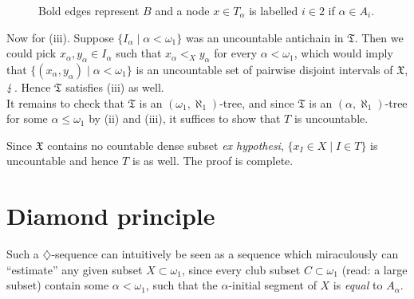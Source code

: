 {\begin{figure}[h]
\label{01graph Figure}
\caption{Bold edges represent $B$ and a node $x\in T_\alpha$ is labelled $i\in 2$ if $\alpha\in A_i$.}
\end{figure}

Now for (iii). Suppose $\{I_\alpha\mid\alpha<\omega_1\}$ was an uncountable antichain in $\mathfrak{T}$. Then we could pick $x_\alpha,y_\alpha\in I_\alpha$ such that $x_\alpha<_Xy_\alpha$ for every $\alpha<\omega_1$, which would imply that $\{(x_\alpha,y_\alpha)\mid\alpha<\omega_1\}$ is an uncountable set of pairwise disjoint intervals of $\mathfrak{X}$, $\operatorname{\lightning}$. Hence $\mathfrak{T}$ satisfies (iii) as well.\\

It remains to check that $\mathfrak{T}$ is an $(\omega_1,\aleph_1)$-tree, and since $\mathfrak{T}$ is an $(\alpha,\aleph_1)$-tree for some $\alpha\leq\omega_1$ by (ii) and (iii), it suffices to show that $T$ is uncountable.



Since $\mathfrak{X}$ contains no countable dense subset \textit{ex hypothesi}, $\{x_I\in X\mid I\in T\}$ is uncountable and hence $T$ is as well. The proof is complete.
}

\section{Diamond principle}

Such a $\diamondsuit$-sequence can intuitively be seen as a sequence which miraculously can ``estimate'' any given subset $X\subset\omega_1$, since every club subset $C\subset\omega_1$ (read: a large subset) contain some $\alpha<\omega_1$, such that the $\alpha$-initial segment of $X$ is \textit{equal} to $A_\alpha$.

